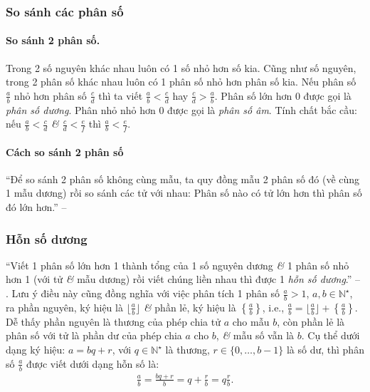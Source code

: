 \documentclass{article}
\numberwithin{equation}{section}
\begin{document}
\subsubsection{So sánh các phân số}

\paragraph{So sánh 2 phân số.}
Trong 2 số nguyên khác nhau luôn có 1 số nhỏ hơn số kia. Cũng như số nguyên, trong 2 phân số khác nhau luôn có 1 phân số nhỏ hơn phân số kia. Nếu phân số $\frac{a}{b}$ nhỏ hơn phân số $\frac{c}{d}$ thì ta viết $\frac{a}{b} < \frac{c}{d}$ hay $\frac{c}{d} > \frac{a}{b}$. Phân số lớn hơn 0 được gọi là \emph{phân số dương}. Phân nhỏ nhỏ hơn 0 được gọi là \emph{phân số âm}. Tính chất bắc cầu: nếu $\frac{a}{b} < \frac{c}{d}$ \textit{\&} $\frac{c}{d} < \frac{e}{f}$ thì $\frac{a}{b} < \frac{e}{f}$.

\paragraph{Cách so sánh 2 phân số}
``Để so sánh 2 phân số không cùng mẫu, ta quy đồng mẫu 2 phân số đó (về cùng 1 mẫu dương) rồi so sánh các tử với nhau: Phân số nào có tử lớn hơn thì phân số đó lớn hơn.'' -- \cite[p. 31]{SGK_Toan_6_Canh_Dieu_tap_1}

\subsubsection{Hỗn số dương}
``Viết 1 phân số lớn hơn 1 thành tổng của 1 số nguyên dương \textit{\&} 1 phân số nhỏ hơn 1 (với tử \textit{\&} mẫu dương) rồi viết chúng liền nhau thì được 1 \emph{hỗn số dương}.'' -- \cite[p. 32]{SGK_Toan_6_Canh_Dieu_tap_2}. Lưu ý điều này cũng đồng nghĩa với việc phân tích 1 phân số $\frac{a}{b} > 1$, $a,b\in\mathbb{N}^\star$, ra phần nguyên, ký hiệu là $\lfloor\frac{a}{b}\rfloor$ \textit{\&} phần lẻ, ký hiệu là $\left\{\frac{a}{b}\right\}$, i.e., $\frac{a}{b} = \lfloor\frac{a}{b}\rfloor + \left\{\frac{a}{b}\right\}$. Dễ thấy phần nguyên là thương của phép chia tử $a$ cho mẫu $b$, còn phần lẻ là phân số với tử là phần dư của phép chia $a$ cho $b$, \textit{\&} mẫu số vẫn là $b$. Cụ thể dưới dạng ký hiệu: $a = bq + r$, với $q\in\mathbb{N}^\star$ là thương, $r\in\{0,\ldots,b - 1\}$ là số dư, thì phân số $\frac{a}{b}$ được viết dưới dạng hỗn số là:
\begin{align*}
	\frac{a}{b} = \frac{bq + r}{b} = q + \frac{r}{b} = q\frac{r}{b}.
\end{align*}
\end{document}

